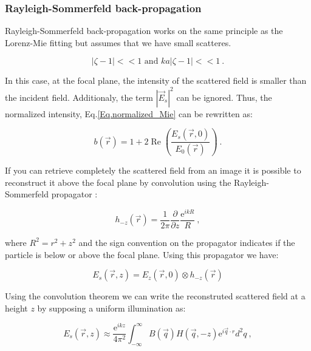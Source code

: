 \subsubsection{ Rayleigh-Sommerfeld back-propagation}





Rayleigh-Sommerfeld back-propagation \cite{wilson_3d_2012} works on the same principle as the Lorenz-Mie fitting but assumes that we have small scatteres.

\begin{equation}
	|\zeta - 1| << 1 \text{ and } ka|\zeta - 1| << 1 ~.
\end{equation}

In this case, at the focal plane, the intensity of the scattered field is smaller than the incident field. Additionaly, the term $|\vec{E}_s|^2$ can be ignored. Thus, the normalized intensity, Eq.\ref{Eq.normalized_Mie} can be rewritten as:

\begin{equation}
	b(\vec{r})= 1 + 2\operatorname{Re}\left( \frac{E_s(\vec{r},0)}{E_0(\vec{r})} \right) ~.
\end{equation}

If you can retrieve completely the scattered field from an image it is possible to reconstruct it above the focal plane by convolution using the Rayleigh-Sommerfeld propagator \cite{goodman_introduction_2005}:

\begin{equation}
	h_{-z}(\vec{r}) = \frac{1}{2 \pi} \frac{\partial}{\partial z} \frac{\mathrm{e}^{ikR}}{R} ~,
\end{equation}

where $ R^2 = r^2 + z^2 $ and the sign convention on the propagator indicates if the particle is below or above the focal plane. Using this propagator we have:

\begin{equation}
	E_s(\vec{r}, z) = E_z(\vec{r}, 0) \otimes h_{-z}(\vec{r})
\end{equation}

Using the convolution theorem \cite{cheong_strategies_2010, goodman_introduction_2005, sherman_application_1967,schnars_digital_1994} we can write the reconstruted scattered field at a height $z$ by supposing a uniform illumination as:

\begin{equation}
	E_s(\vec{r}, z) \approx \frac{\mathrm{e}^{ikz}}{4\pi ^2}
	\int ^\infty _{- \infty}
	B(\vec{q}) H(\vec{q}, -z) \mathrm{e}^{i \vec{q} \cdot r} d^2 q
	\label{Eq.RS} ~,
\end{equation}

